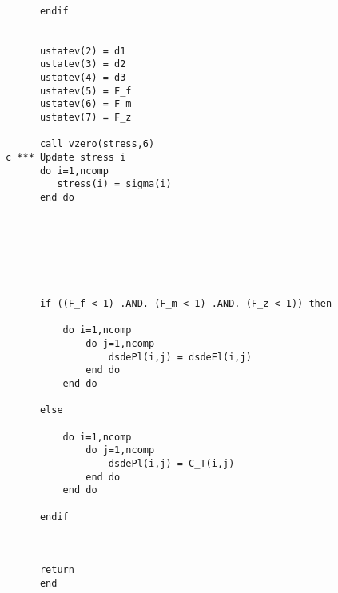\begin{lstlisting}
            
      endif
      

      ustatev(2) = d1
      ustatev(3) = d2
      ustatev(4) = d3
      ustatev(5) = F_f
      ustatev(6) = F_m
      ustatev(7) = F_z

      call vzero(stress,6)
c *** Update stress i
      do i=1,ncomp
         stress(i) = sigma(i)
      end do
      
      
 

      

      
      if ((F_f < 1) .AND. (F_m < 1) .AND. (F_z < 1)) then
          
          do i=1,ncomp
              do j=1,ncomp
                  dsdePl(i,j) = dsdeEl(i,j)        
              end do
          end do 
      
      else
          
          do i=1,ncomp
              do j=1,ncomp
                  dsdePl(i,j) = C_T(i,j)        
              end do
          end do 
          
      endif  
      
      
      
      return
      end
	
\end{lstlisting}

              
              
              
              
              
              
              
              
              
              
              
              
              
              
              
              
              
              
              
              
              
              
              
              
              
              
              
              
              
              
              

      

      
      
      
      
